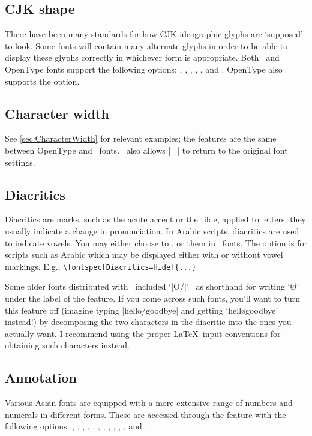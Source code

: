 \documentclass[a4paper]{l3doc}
\begin{document}
\subsection{CJK shape}
There have been many standards for how CJK ideographic
glyphs are `supposed' to look. Some fonts will contain many alternate
glyphs in order to be able to display these glyphs
correctly in whichever form is appropriate. Both \AAT\ and OpenType
fonts support the following  options:
, , , ,
, and . OpenType also supports the  option.

\subsection{Character width}
See \vref{sec:CharacterWidth} for relevant examples; the features are
the same between OpenType and \AAT\ fonts.
\AAT\ also allows |=| to return to
the original font settings.

\subsection{Diacritics}
Diacritics are marks, such as the acute accent or the tilde, applied to letters; they usually indicate a change in pronunciation.
In Arabic scripts, diacritics are used to indicate vowels.
You may either choose
to ,  or  them in \AAT\ fonts.
The  option is for scripts such as Arabic which may be
displayed either with or without vowel markings. E.g.,
\verb|\fontspec[Diacritics=Hide]{...}|

Some older fonts distributed with \MacOSX\ included `|O/|' \etc\ as shorthand for writing `\O' under the label of the  feature. If you come across such fonts, you'll
want to turn this feature off (imagine typing |hello/goodbye| and
getting `hell\o goodbye' instead!) by decomposing the two characters
in the diacritic into the ones you actually
want. I recommend using
the proper \LaTeX\ input conventions for obtaining such characters
instead.


\subsection{Annotation}
Various Asian fonts are equipped with a more extensive range of
numbers and numerals in different forms. These are accessed through
the  feature with the following
options: ,
, , , ,
, , , ,
, , and .
\end{document}
